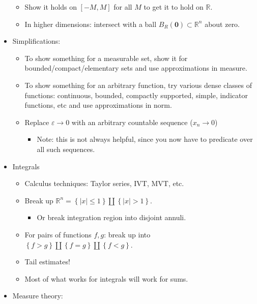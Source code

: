 \begin{itemize}
  \begin{itemize}
  \tightlist
  \item
    Show it holds on \([-M, M]\) for all \(M\) to get it to hold on
    \({\mathbb{R}}\).
  \item
    In higher dimensions: intersect with a ball
    \(B_R(\mathbf{0})\subset {\mathbb{R}}^n\) about zero.
  \end{itemize}
\item
  Simplifications:

  \begin{itemize}
  \tightlist
  \item
    To show something for a measurable set, show it for
    bounded/compact/elementary sets and use approximations in measure.
  \item
    To show something for an arbitrary function, try various dense
    classes of functions: continuous, bounded, compactly supported,
    simple, indicator functions, etc and use approximations in norm.
  \item
    Replace \({\varepsilon}\to 0\) with an arbitrary countable sequence
    (\(x_n \to 0\))

    \begin{itemize}
    \tightlist
    \item
      Note: this is not always helpful, since you now have to predicate
      over all such sequences.
    \end{itemize}
  \end{itemize}
\item
  Integrals

  \begin{itemize}
  \tightlist
  \item
    Calculus techniques: Taylor series, IVT, MVT, etc.
  \item
    Break up
    \({\mathbb{R}}^n = \left\{{{\left\lvert {x} \right\rvert} \leq 1}\right\} \coprod \left\{{{\left\lvert {x} \right\rvert} > 1}\right\}\).

    \begin{itemize}
    \tightlist
    \item
      Or break integration region into disjoint annuli.
    \end{itemize}
  \item
    For pairs of functions \(f, g\): break up into
    \(\left\{{f>g}\right\} {\textstyle\coprod}\left\{{f=g}\right\} {\textstyle\coprod}\left\{{f< g}\right\}\).
  \item
    Tail estimates!
  \item
    Most of what works for integrals will work for sums.
  \end{itemize}
\item
  Measure theory:


\end{itemize}
